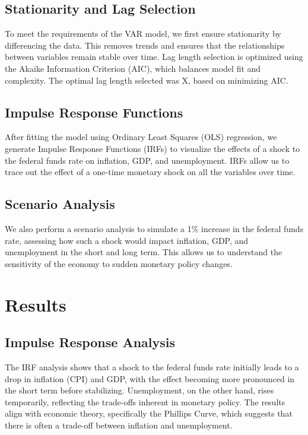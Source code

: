 \documentclass{article}
\begin{document}
\subsection{Stationarity and Lag Selection}
To meet the requirements of the VAR model, we first ensure stationarity by differencing the data. This removes trends and ensures that the relationships between variables remain stable over time. Lag length selection is optimized using the Akaike Information Criterion (AIC), which balances model fit and complexity. The optimal lag length selected was X, based on minimizing AIC.

\subsection{Impulse Response Functions}
After fitting the model using Ordinary Least Squares (OLS) regression, we generate Impulse Response Functions (IRFs) to visualize the effects of a shock to the federal funds rate on inflation, GDP, and unemployment. IRFs allow us to trace out the effect of a one-time monetary shock on all the variables over time.

\subsection{Scenario Analysis}
We also perform a scenario analysis to simulate a 1\% increase in the federal funds rate, assessing how such a shock would impact inflation, GDP, and unemployment in the short and long term. This allows us to understand the sensitivity of the economy to sudden monetary policy changes.

\section{Results}

\subsection{Impulse Response Analysis}
The IRF analysis shows that a shock to the federal funds rate initially leads to a drop in inflation (CPI) and GDP, with the effect becoming more pronounced in the short term before stabilizing. Unemployment, on the other hand, rises temporarily, reflecting the trade-offs inherent in monetary policy. The results align with economic theory, specifically the Phillips Curve, which suggests that there is often a trade-off between inflation and unemployment.
\end{document}
